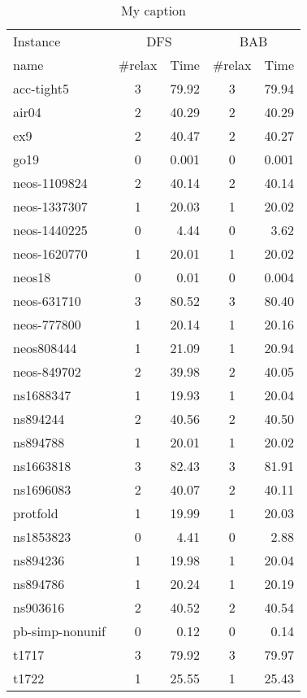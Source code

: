 \begin{table}[]
\centering
\caption{My caption}
\label{my-label}
\begin{tabular}{|l|c|r|c|r|}
\hline
Instance & \multicolumn{2}{c|}{DFS} & \multicolumn{2}{c|}{BAB} \\ \cline{2-5} 
name     &  \#relax      & Time     & \#relax      & Time     \\ \hline
acc-tight5 & 3 & 79.92 & 3 & 79.94 \\ 
air04 & 2 & 40.29 & 2 & 40.29 \\ 
ex9 & 2 & 40.47 & 2 & 40.27 \\ 
go19 & 0 & 0.001 & 0 & 0.001 \\ 
neos-1109824 & 2 & 40.14 & 2 & 40.14 \\ 
neos-1337307 & 1 & 20.03 & 1 & 20.02 \\ 
neos-1440225 & 0 & 4.44 & 0 & 3.62 \\ 
neos-1620770 & 1 & 20.01 & 1 & 20.02 \\ 
neos18 & 0 & 0.01 & 0 & 0.004 \\ 
neos-631710 & 3 & 80.52 & 3 & 80.40 \\ 
neos-777800 & 1 & 20.14 & 1 & 20.16 \\ 
neos808444 & 1 & 21.09 & 1 & 20.94 \\ 
neos-849702 & 2 & 39.98 & 2 & 40.05 \\ 
ns1688347 & 1 & 19.93 & 1 & 20.04 \\ 
ns894244 & 2 & 40.56 & 2 & 40.50 \\ 
ns894788 & 1 & 20.01 & 1 & 20.02 \\ 
ns1663818 & 3 & 82.43 & 3 & 81.91 \\ 
ns1696083 & 2 & 40.07 & 2 & 40.11 \\ 
protfold & 1 & 19.99 & 1 & 20.03 \\ 
ns1853823 & 0 & 4.41 & 0 & 2.88 \\ 
ns894236 & 1 & 19.98 & 1 & 20.04 \\ 
ns894786 & 1 & 20.24 & 1 & 20.19 \\ 
ns903616 & 2 & 40.52 & 2 & 40.54 \\ 
pb-simp-nonunif & 0 & 0.12 & 0 & 0.14 \\ 
t1717 & 3 & 79.92 & 3 & 79.97 \\ 
t1722 & 1 & 25.55 & 1 & 25.43 \\ \hline
\end{tabular}
\end{table}